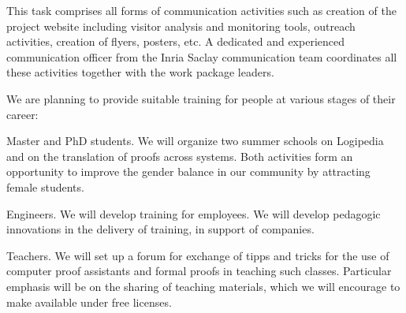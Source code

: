 \begin{workpackage}[id=dissemination,type=MGT,wphases=1-48,
  short={Dissemination},
  title={Dissemination, communication and exploitation},
  lead=Lie,LieRM=1,InrRM=6,BirRM=4,CleRM=2,ImtRM=2,StrRM=2,ZibRM=14,EduRM=12]
\begin{tasklist}

  \begin{task}[id=com,
      title=Communication,
      shorttitle=Comm.,
      lead=Inr,InrRM=6,wphases=1-48!.25]

    This task comprises all forms of communication activities such as
    creation of the project website including visitor analysis and
    monitoring tools, outreach activities, creation of flyers,
    posters, etc.  A dedicated and experienced communication officer
    from the Inria Saclay communication team coordinates all these
    activities together with the work package leaders.
  \end{task}

  \begin{task}[id=training,
      title=Training Logipedia developers and users,
      shorttitle=Train.,
      lead=Bir,BirRM=2,wphases=1-48!.05]
    We are planning to provide suitable training
    for people at various stages of their career:

    \begin{compactitem}
    \item Master and PhD students.
      We will organize two summer schools on Logipedia
      and on the translation of proofs across systems.
      Both activities form an
      opportunity to improve the gender balance in our community by
      attracting female students.
    \item Engineers.
      We will develop training for employees.
      We will develop pedagogic innovations in the delivery of training,
      in support of companies.
    \item Teachers.
      We will set up a forum for exchange of tipps and tricks for the use
      of computer proof assistants and formal proofs in teaching such classes.
      Particular emphasis will be on the sharing of teaching materials, which
      we will encourage to make available under free licenses.
    \end{compactitem}


\end{task}
\end{tasklist}
\end{workpackage}
